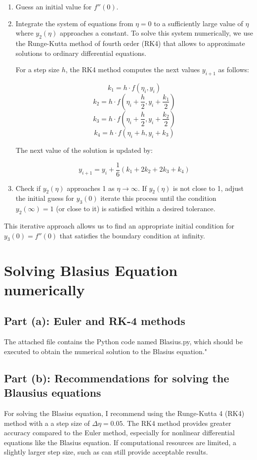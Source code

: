 \documentclass{article}
\begin{document}
\begin{enumerate}
    \item Guess an initial value for \( f''(0) \).
    \item Integrate the system of equations from \( \eta = 0 \) to a sufficiently large value of \( \eta \)  where \( y_2(\eta) \) approaches a constant. 
    To solve this system numerically, we use the Runge-Kutta method of fourth order (RK4) that allows to approximate solutions to ordinary differential equations.
    
    For a step size \( h \), the RK4 method computes the next values \( y_{i+1} \) as follows:
    
    \[
    k_1 = h \cdot f(\eta_i, y_i)
    \]
    \[
    k_2 = h \cdot f\left(\eta_i + \frac{h}{2}, y_i + \frac{k_1}{2}\right)
    \]
    \[
    k_3 = h \cdot f\left(\eta_i + \frac{h}{2}, y_i + \frac{k_2}{2}\right)
    \]
    \[
    k_4 = h \cdot f(\eta_i + h, y_i + k_3)
    \]
    
    The next value of the solution is updated by:
    
    \[
    y_{i+1} = y_i + \frac{1}{6} \left(k_1 + 2k_2 + 2k_3 + k_4\right)
    \]

    \item Check if \( y_2(\eta) \) approaches 1 as \( \eta \to \infty \). If \( y_2(\eta) \) is not close to 1, adjust the initial guess for \( y_3(0) \) 
    iterate this process until the condition \( y_2(\infty) = 1 \) (or close to it) is satisfied within a desired tolerance.
\end{enumerate}

This iterative approach allows us to find an appropriate initial condition for \( y_3(0) = f''(0) \) that satisfies the boundary condition at infinity.





\section{ Solving Blasius Equation numerically}

\subsection*{Part (a): Euler and RK-4 methods}
The attached file contains the Python code named Blasius.py, which should be executed to obtain the numerical solution to the Blasius equation."

\subsection*{Part (b): Recommendations for solving the Blausius equations}
For solving the Blasius equation, I recommend using the Runge-Kutta 4 (RK4) method with a a step size of \( \Delta \eta = 0.05 \).
The RK4 method provides greater accuracy compared to the Euler method, especially for nonlinear differential equations like the Blasius equation. 
If computational resources are limited, a slightly larger step size, such as can still provide acceptable results.
\end{document}
